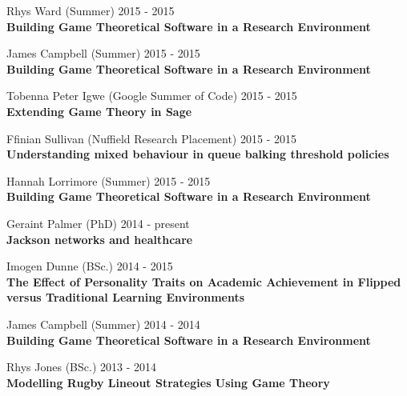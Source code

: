 \documentclass[10pt]{res} %
\begin{document}
\begin{resume}
\begin{etaremune}
\item
    Rhys Ward (Summer) \hfill 2015 -
    2015\\
\textbf{Building Game Theoretical Software in a Research Environment}\\

\item
    James Campbell (Summer) \hfill 2015 -
    2015\\
\textbf{Building Game Theoretical Software in a Research Environment}\\

\item
    Tobenna Peter Igwe (Google Summer of Code) \hfill 2015 -
    2015\\
\textbf{Extending Game Theory in Sage}\\

\item
    Ffinian Sullivan (Nuffield Research Placement) \hfill 2015 -
    2015\\
\textbf{Understanding mixed behaviour in queue balking threshold policies}\\

\item
    Hannah Lorrimore (Summer) \hfill 2015 -
    2015\\
\textbf{Building Game Theoretical Software in a Research Environment}\\

\item
    Geraint Palmer (PhD) \hfill 2014 -
    present\\
\textbf{Jackson networks and healthcare}\\

\item
    Imogen Dunne (BSc.) \hfill 2014 -
    2015\\
\textbf{The Effect of Personality Traits on Academic Achievement in Flipped versus Traditional Learning Environments}\\

\item
    James Campbell (Summer) \hfill 2014 -
    2014\\
\textbf{Building Game Theoretical Software in a Research Environment}\\

\item
    Rhys Jones (BSc.) \hfill 2013 -
    2014\\
\textbf{Modelling Rugby Lineout Strategies Using Game Theory}\\


\end{etaremune}
\end{resume}
\end{document}
